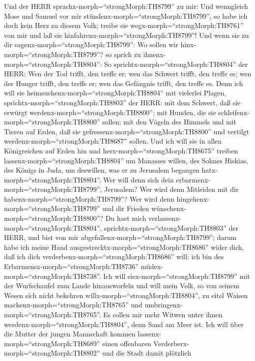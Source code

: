  Und der HERR sprachx-morph=``strongMorph:TH8799'' zu mir:
Und wenngleich Mose und Samuel vor mir
stündenx-morph=``strongMorph:TH8799'', so habe ich doch kein Herz zu
diesem Volk; treibe sie wegx-morph=``strongMorph:TH8761'' von mir und
laß sie hinfahrenx-morph=``strongMorph:TH8799''!  Und wenn
sie zu dir sagenx-morph=``strongMorph:TH8799'': Wo sollen wir
hinx-morph=``strongMorph:TH8799''? so sprich zu
ihnenx-morph=``strongMorph:TH8804'': So
sprichtx-morph=``strongMorph:TH8804'' der HERR: Wen der Tod trifft, den
treffe er; wen das Schwert trifft, den treffe es; wen der Hunger trifft,
den treffe er; wen das Gefängnis trifft, den treffe es. 
Denn ich will sie heimsuchenx-morph=``strongMorph:TH8804'' mit vielerlei
Plagen, sprichtx-morph=``strongMorph:TH8803'' der HERR: mit dem Schwert,
daß sie erwürgt werdenx-morph=``strongMorph:TH8800''; mit Hunden, die
sie schleifenx-morph=``strongMorph:TH8800'' sollen; mit den Vögeln des
Himmels und mit Tieren auf Erden, daß sie
gefressenx-morph=``strongMorph:TH8800'' und vertilgt
werdenx-morph=``strongMorph:TH8687'' sollen.  Und ich will
sie in allen Königreichen auf Erden hin und
herx-morph=``strongMorph:TH8675'' treiben
lassenx-morph=``strongMorph:TH8804'' um Manasses willen, des Sohnes
Hiskias, des Königs in Juda, um deswillen, was er zu Jerusalem begangen
hatx-morph=``strongMorph:TH8804''.  Wer will denn sich dein
erbarmenx-morph=``strongMorph:TH8799'', Jerusalem? Wer wird denn
Mitleiden mit dir habenx-morph=``strongMorph:TH8799''? Wer wird denn
hingehenx-morph=``strongMorph:TH8799'' und dir Frieden
wünschenx-morph=``strongMorph:TH8800''?  Du hast mich
verlassenx-morph=``strongMorph:TH8804'',
sprichtx-morph=``strongMorph:TH8803'' der HERR, und bist von mir
abgefallenx-morph=``strongMorph:TH8799''; darum habe ich meine Hand
ausgestrecktx-morph=``strongMorph:TH8686'' wider dich, daß ich dich
verderbenx-morph=``strongMorph:TH8686'' will; ich bin des
Erbarmensx-morph=``strongMorph:TH8736''
müdex-morph=``strongMorph:TH8738''.  Ich will
siex-morph=``strongMorph:TH8799'' mit der Wurfschaufel zum Lande
hinausworfeln und will mein Volk, so von seinem Wesen sich nicht
bekehren willx-morph=``strongMorph:TH8804'', zu eitel Waisen
machenx-morph=``strongMorph:TH8765'' und
umbringenx-morph=``strongMorph:TH8765''.  Es sollen mir mehr
Witwen unter ihnen werdenx-morph=``strongMorph:TH8804'', denn Sand am
Meer ist. Ich will über die Mutter der jungen Mannschaft kommen
lassenx-morph=``strongMorph:TH8689'' einen offenbaren
Verderberx-morph=``strongMorph:TH8802'' und die Stadt damit plötzlich
